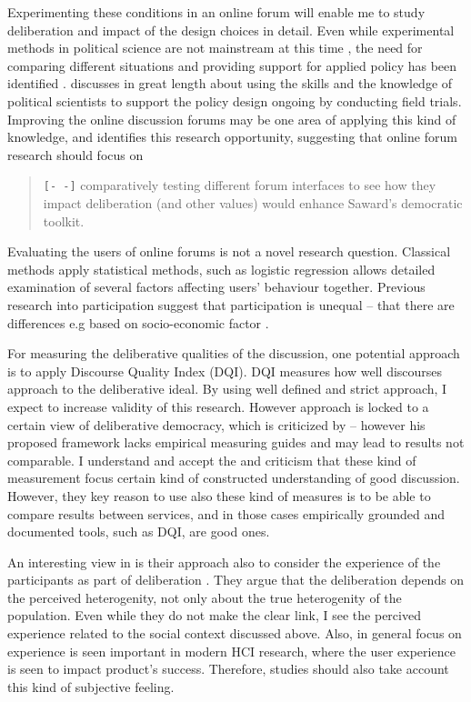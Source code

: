 \documentclass[journal,a4paper]{IEEEtran}
\begin{document}
Experimenting these conditions in an online forum will enable me to study deliberation and impact of the design choices in detail. Even while experimental methods in political science are not mainstream at this time \cite{green03,druckman06}, the need for comparing different situations and providing support for applied policy has been identified \cite{stoker10}.  discusses in great length about using the skills and the knowledge of political scientists to support the policy design ongoing by conducting field trials. Improving the online discussion forums may be one area of applying this kind of knowledge, and  identifies this research opportunity, suggesting that online forum research should focus on

\begin{quote}
\texttt{[- -]} comparatively testing different forum interfaces to see how they impact deliberation (and other values) would 
enhance Saward’s democratic toolkit.
\end{quote}

Evaluating the users of online forums is not a novel research question. Classical methods apply statistical methods, such as logistic regression allows detailed examination of several factors affecting users' behaviour together. Previous research into participation suggest that participation is unequal -- that there are differences e.g  based on socio-economic factor .

For measuring the deliberative qualities of the discussion, one potential approach is to apply  Discourse Quality Index (DQI). DQI measures how well discourses approach to the deliberative ideal. By using well defined and strict approach, I expect to increase validity of this research. However  approach is locked to a certain view of deliberative democracy, which is criticized by  -- however his proposed framework lacks empirical measuring guides and may lead to results not comparable. I understand and accept the  and  criticism that these kind of measurement focus certain kind of constructed understanding of good discussion. However, they key reason to use also these kind of measures is to be able to compare results between services, and in those cases empirically grounded and documented tools, such as DQI, are good ones.

An interesting view in  is their approach also to consider the experience of the participants as part of deliberation . They argue that the deliberation depends on the perceived heterogenity, not only about the true heterogenity of the population. Even while they do not make the clear link, I see the percived experience related to the social context discussed above. Also, in general focus on experience is seen important in modern HCI research, where the user experience is seen to impact product's success. Therefore, studies should also take account this kind of subjective feeling.



\end{document}
